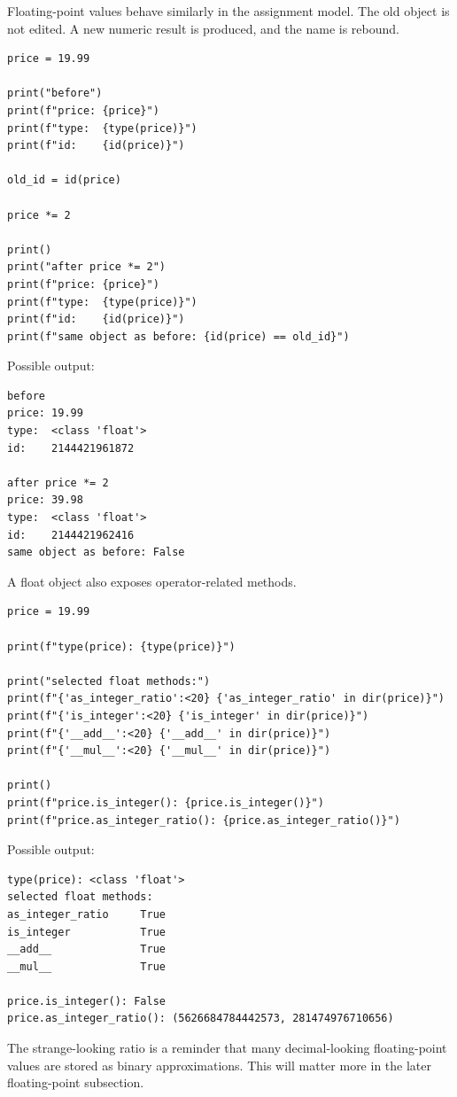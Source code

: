Floating-point values behave similarly in the assignment model. The old object is not edited. A new numeric result is produced, and the name is rebound.

\begin{verbatim}
price = 19.99

print("before")
print(f"price: {price}")
print(f"type:  {type(price)}")
print(f"id:    {id(price)}")

old_id = id(price)

price *= 2

print()
print("after price *= 2")
print(f"price: {price}")
print(f"type:  {type(price)}")
print(f"id:    {id(price)}")
print(f"same object as before: {id(price) == old_id}")
\end{verbatim}

Possible output:

\begin{verbatim}
before
price: 19.99
type:  <class 'float'>
id:    2144421961872

after price *= 2
price: 39.98
type:  <class 'float'>
id:    2144421962416
same object as before: False
\end{verbatim}

A float object also exposes operator-related methods.

\begin{verbatim}
price = 19.99

print(f"type(price): {type(price)}")

print("selected float methods:")
print(f"{'as_integer_ratio':<20} {'as_integer_ratio' in dir(price)}")
print(f"{'is_integer':<20} {'is_integer' in dir(price)}")
print(f"{'__add__':<20} {'__add__' in dir(price)}")
print(f"{'__mul__':<20} {'__mul__' in dir(price)}")

print()
print(f"price.is_integer(): {price.is_integer()}")
print(f"price.as_integer_ratio(): {price.as_integer_ratio()}")
\end{verbatim}

Possible output:

\begin{verbatim}
type(price): <class 'float'>
selected float methods:
as_integer_ratio     True
is_integer           True
__add__              True
__mul__              True

price.is_integer(): False
price.as_integer_ratio(): (5626684784442573, 281474976710656)
\end{verbatim}

The strange-looking ratio is a reminder that many decimal-looking floating-point values are stored as binary approximations. This will matter more in the later floating-point subsection.

